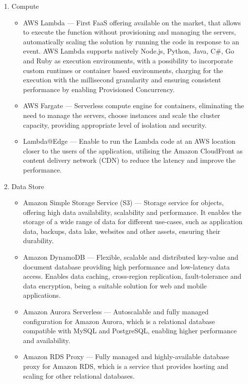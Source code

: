 \begin{enumerate}
   \item Compute
   \begin{itemize}
       \item AWS Lambda --- First FaaS offering available on the market, that allows to execute the function without provisioning and managing the servers, automatically scaling the solution by running the code in response to an event. AWS Lambda supports natively Node.js, Python, Java, C\#, Go and Ruby as execution environments, with a possibility to incorporate custom runtimes or container based environments, charging for the execution with the millisecond granularity and ensuring consistent performance by enabling Provisioned Concurrency.
       \item AWS Fargate --- Serverless compute engine for containers, eliminating the need to manage the servers, choose instances and scale the cluster capacity, providing appropriate level of isolation and security.
       \item Lambda@Edge --- Enable to run the Lambda code at an AWS location closer to the users of the application, utilising the Amazon CloudFront as content delivery network (CDN) to reduce the latency and improve the performance.
   \end{itemize}
   \item Data Store
   \begin{itemize}
       \item Amazon Simple Storage Service (S3) --- Storage service for objects, offering high data availability, scalability and performance. It enables the storage of a wide range of data for different use-cases, such as application data, backups, data lake, websites and other assets, ensuring their durability.
       \item Amazon DynamoDB --- Flexible, scalable and distributed key-value and document database providing high performance and low-latency data access. Enables data caching, cross-region replication, fault-tolerance and data encryption, being a suitable solution for web and mobile applications.
       \item Amazon Aurora Serverless --- Autoscalable and fully managed configuration for Amazon Aurora, which is a relational database compatible with MySQL and PostgreSQL, enabling higher performance and availability.
       \item Amazon RDS Proxy --- Fully managed and highly-available database proxy for Amazon RDS, which is a service that provides hosting and scaling for other relational databases.

\end{itemize}
\end{enumerate}
